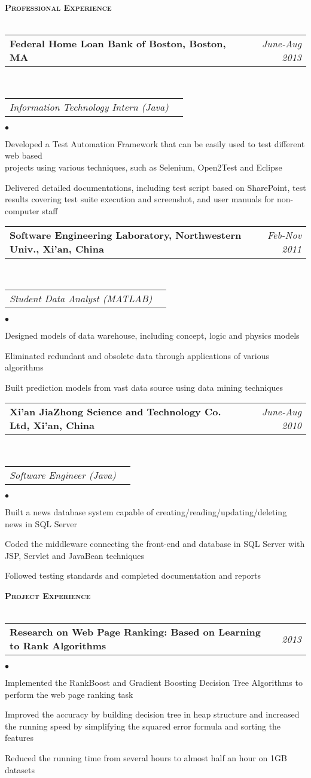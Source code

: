 \documentclass[11pt]{article}
\makeatletter
\newcommand{\lineunder}{\vspace*{-8pt} \\ \hspace*{-18pt} \hrulefill \\}
\newcommand{\header}[1]{{\hspace*{-15pt}\vspace*{6pt} \large \textsc{\textbf{#1}}} \vspace*{-6pt} \lineunder}
\newenvironment{achievements}{\begin{list}{$\bullet$}{\topsep 0pt \itemsep -2pt}}{\vspace*{4pt}\end{list}}
\newcommand{\headerrow}[2]
{\begin{tabular*}{\linewidth}{l@{\extracolsep{\fill}}r}
	\hspace*{-15pt}#1 & #2 \\
\end{tabular*}}
\newcommand{\headerrowww}[1]
{\begin{tabular*}{\linewidth}{l@{\extracolsep{\fill}}r}
	#1 &\\
\end{tabular*}}
\makeatother
\begin{document}
\vspace*{2.5pt}
\header{Professional Experience}
\headerrow
{\textbf{Federal Home Loan Bank of Boston, Boston, MA}}
{\emph{June-Aug 2013}}
\\
\headerrowww
{\emph{Information Technology Intern (Java)}}
	\begin{achievements}
	\item Developed a Test Automation Framework that can be easily used to test different web based \\ projects 
	using various techniques, such as Selenium, Open2Test and Eclipse
	\item Delivered  detailed documentations, including test script based on SharePoint, test results covering 
	test suite execution and  screenshot, and user manuals for non-computer staff 
	\end{achievements}
	
\headerrow
{\textbf{Software Engineering Laboratory, Northwestern Univ., Xi'an, China}}
{\emph{Feb-Nov 2011}}
\\
\headerrowww
{\emph{Student Data Analyst (MATLAB)}}
	\begin{achievements}
	\item Designed models of data warehouse, including concept, logic and physics models
	\item Eliminated redundant and obsolete data through applications of various algorithms
	\item Built prediction models from vast data source using data mining techniques
	\end{achievements}
	
\headerrow
{\textbf{Xi'an JiaZhong Science and Technology Co. Ltd, Xi'an, China}}
{\emph{June-Aug 2010}}
\\
\headerrowww
{\emph{Software Engineer (Java)}}
	\begin{achievements}
	\item Built a news database system capable of  creating/reading/updating/deleting news in SQL Server
	\item Coded the middleware connecting the front-end and database in SQL Server with JSP, Servlet and JavaBean techniques
	\item Followed testing standards and completed documentation and reports
	\end{achievements}


\vspace*{2.5pt}
\header{Project Experience}
\headerrow
{\textbf{Research on Web Page Ranking: Based on Learning to Rank Algorithms}}
{\emph{2013}}
	\begin{achievements}
  \item Implemented the RankBoost and Gradient Boosting Decision Tree Algorithms to perform the web page ranking task
  \item Improved the accuracy by building decision tree in heap structure and increased the running speed by simplifying the squared error formula and sorting the features
  \item Reduced the running time from several hours to almost half an hour on 1GB datasets
  \end{achievements}
  
\end{document}
